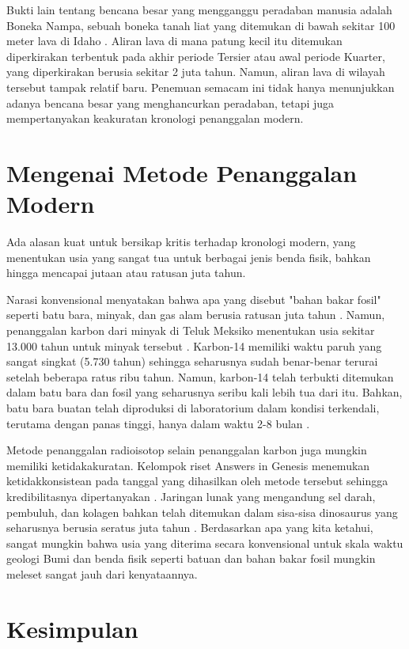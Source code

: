 \documentclass[10pt,twocolumn,letterpaper]{article}
\begin{document}
Bukti lain tentang bencana besar yang mengganggu peradaban manusia adalah Boneka Nampa, sebuah boneka tanah liat yang ditemukan di bawah sekitar 100 meter lava di Idaho \cite{102,103}. Aliran lava di mana patung kecil itu ditemukan diperkirakan terbentuk pada akhir periode Tersier atau awal periode Kuarter, yang diperkirakan berusia sekitar 2 juta tahun. Namun, aliran lava di wilayah tersebut tampak relatif baru. Penemuan semacam ini tidak hanya menunjukkan adanya bencana besar yang menghancurkan peradaban, tetapi juga mempertanyakan keakuratan kronologi penanggalan modern.

\section{Mengenai Metode Penanggalan Modern}

Ada alasan kuat untuk bersikap kritis terhadap kronologi modern, yang menentukan usia yang sangat tua untuk berbagai jenis benda fisik, bahkan hingga mencapai jutaan atau ratusan juta tahun.

Narasi konvensional menyatakan bahwa apa yang disebut "bahan bakar fosil" seperti batu bara, minyak, dan gas alam berusia ratusan juta tahun \cite{104}. Namun, penanggalan karbon dari minyak di Teluk Meksiko menentukan usia sekitar 13.000 tahun untuk minyak tersebut \cite{105}. Karbon-14 memiliki waktu paruh yang sangat singkat (5.730 tahun) sehingga seharusnya sudah benar-benar terurai setelah beberapa ratus ribu tahun. Namun, karbon-14 telah terbukti ditemukan dalam batu bara dan fosil yang seharusnya seribu kali lebih tua dari itu\cite{106}. Bahkan, batu bara buatan telah diproduksi di laboratorium dalam kondisi terkendali, terutama dengan panas tinggi, hanya dalam waktu 2-8 bulan \cite{107}.

Metode penanggalan radioisotop selain penanggalan karbon juga mungkin memiliki ketidakakuratan. Kelompok riset Answers in Genesis menemukan ketidakkonsistean pada tanggal yang dihasilkan oleh metode tersebut sehingga kredibilitasnya dipertanyakan \cite{108}. Jaringan lunak yang mengandung sel darah, pembuluh, dan kolagen bahkan telah ditemukan dalam sisa-sisa dinosaurus yang seharusnya berusia seratus juta tahun \cite{109,110}. Berdasarkan apa yang kita ketahui, sangat mungkin bahwa usia yang diterima secara konvensional untuk skala waktu geologi Bumi dan benda fisik seperti batuan dan bahan bakar fosil mungkin meleset sangat jauh dari kenyataannya.

\section{Kesimpulan}
\end{document}
